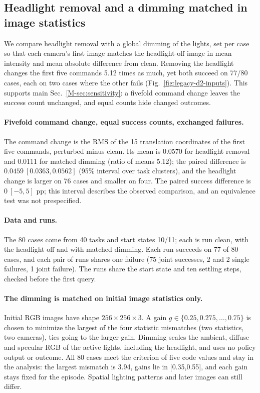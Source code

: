 \subsection{Headlight removal and a dimming matched in image statistics}
\label{supp:legacy-d2}
We compare headlight removal with a global dimming of the lights, set per case so that each camera's first image matches the headlight-off image in mean intensity and mean absolute difference from clean. Removing the headlight changes the first five commands 5.12 times as much, yet both succeed on 77/80 cases, each on two cases where the other fails (Fig.~\ref{fig:legacy-d2-inputs}). This supports main Sec.~\ref*{M-sec:sensitivity}: a fivefold command change leaves the success count unchanged, and equal counts hide changed outcomes.

\paragraph{Fivefold command change, equal success counts, exchanged failures.}
The command change is the RMS of the 15 translation coordinates of the first five commands, perturbed minus clean. Its mean is 0.0570 for headlight removal and 0.0111 for matched dimming (ratio of means 5.12); the paired difference is $0.0459\ [0.0363,0.0562]$ (95\% interval over task clusters), and the headlight change is larger on 76 cases and smaller on four. The paired success difference is $0\ [-5,5]$ pp; this interval describes the observed comparison, and an equivalence test was not prespecified.

\paragraph{Data and runs.}
The 80 cases come from 40 tasks and start states 10/11; each is run clean, with the headlight off and with matched dimming. Each run succeeds on 77 of 80 cases, and each pair of runs shares one failure (75 joint successes, 2 and 2 single failures, 1 joint failure). The runs share the start state and ten settling steps, checked before the first query.

\paragraph{The dimming is matched on initial image statistics only.}
Initial RGB images have shape $256\times256\times3$. A gain $g\in\{0.25,0.275,\ldots,0.75\}$ is chosen to minimize the largest of the four statistic mismatches (two statistics, two cameras), ties going to the larger gain. Dimming scales the ambient, diffuse and specular RGB of the active lights, including the headlight, and uses no policy output or outcome. All 80 cases meet the criterion of five code values and stay in the analysis: the largest mismatch is 3.94, gains lie in [0.35,0.55], and each gain stays fixed for the episode. Spatial lighting patterns and later images can still differ.

